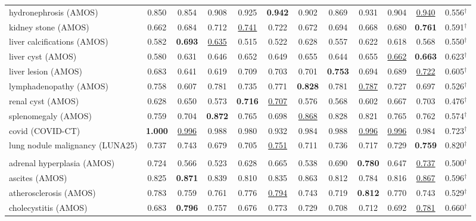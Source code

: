 \begin{minipage}{\textwidth}
{\begin{tabular}{@{}lccccccccccc@{}}
hydronephrosis (AMOS) & 0.850 & 0.854 & 0.908 & 0.925 & \textbf{0.942} & 0.902 & 0.869 & 0.931 & 0.904 & \underline{0.940} & 0.556$^{\dagger}$ \\
kidney stone (AMOS) & 0.662 & 0.684 & 0.712 & \underline{0.741} & 0.722 & 0.672 & 0.694 & 0.668 & 0.680 & \textbf{0.761} & 0.591$^{\dagger}$ \\
liver calcifications (AMOS) & 0.582 & \textbf{0.693} & \underline{0.635} & 0.515 & 0.522 & 0.628 & 0.557 & 0.622 & 0.618 & 0.568 & 0.550$^{\dagger}$ \\
liver cyst (AMOS) & 0.580 & 0.631 & 0.646 & 0.652 & 0.649 & 0.655 & 0.644 & 0.655 & \underline{0.662} & \textbf{0.663} & 0.623$^{\dagger}$ \\
liver lesion (AMOS) & 0.683 & 0.641 & 0.619 & 0.709 & 0.703 & 0.701 & \textbf{0.753} & 0.694 & 0.689 & \underline{0.722} & 0.605$^{\dagger}$ \\
lymphadenopathy (AMOS) & 0.758 & 0.607 & 0.781 & 0.735 & 0.771 & \textbf{0.828} & 0.781 & \underline{0.787} & 0.727 & 0.697 & 0.526$^{\dagger}$ \\
renal cyst (AMOS) & 0.628 & 0.650 & 0.573 & \textbf{0.716} & \underline{0.707} & 0.576 & 0.568 & 0.602 & 0.667 & 0.703 & 0.476$^{\dagger}$ \\
splenomegaly (AMOS) & 0.759 & 0.704 & \textbf{0.872} & 0.765 & 0.698 & \underline{0.868} & 0.828 & 0.821 & 0.765 & 0.762 & 0.574$^{\dagger}$ \\
covid (COVID-CT) & \textbf{1.000} & \underline{0.996} & 0.988 & 0.980 & 0.932 & 0.984 & 0.988 & \underline{0.996} & \underline{0.996} & 0.984 & 0.723$^{\dagger}$ \\
lung nodule malignancy (LUNA25) & 0.737 & 0.743 & 0.679 & 0.705 & \underline{0.751} & 0.711 & 0.736 & 0.717 & 0.729 & \textbf{0.759} & 0.820$^{\dagger}$ \\
\addlinespace
\multicolumn{12}{@{}l}{\textit{joint}} \\
adrenal hyperplasia (AMOS) & 0.724 & 0.566 & 0.523 & 0.628 & 0.665 & 0.538 & 0.690 & \textbf{0.780} & 0.647 & \underline{0.737} & 0.500$^{\dagger}$ \\
ascites (AMOS) & 0.825 & \textbf{0.871} & 0.839 & 0.810 & 0.835 & 0.863 & 0.812 & 0.784 & 0.816 & \underline{0.867} & 0.596$^{\dagger}$ \\
atherosclerosis (AMOS) & 0.783 & 0.759 & 0.761 & 0.776 & \underline{0.794} & 0.743 & 0.719 & \textbf{0.812} & 0.770 & 0.743 & 0.529$^{\dagger}$ \\
cholecystitis (AMOS) & 0.683 & \textbf{0.796} & 0.757 & 0.676 & 0.773 & 0.729 & 0.708 & 0.712 & 0.692 & \underline{0.781} & 0.660$^{\dagger}$ \\

\end{tabular}}
\end{minipage}
